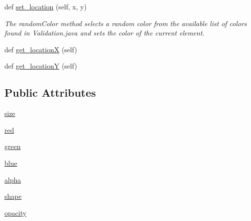 \begin{DoxyCompactItemize}
def \mbox{\hyperlink{class_bridges_1_1_element_visualizer_1_1_element_visualizer_af3ed5e44884f0a02161cd97c77a4ee9c}{set\+\_\+location}} (self, x, y)
\begin{DoxyCompactList}\small\item\em The random\+Color method selects a random color from the available list of colors found in Validation.\+java and sets the color of the current element. \end{DoxyCompactList}\item 
def \mbox{\hyperlink{class_bridges_1_1_element_visualizer_1_1_element_visualizer_a58e34c0b1398329080d2070078e4a71d}{get\+\_\+locationX}} (self)
\item 
def \mbox{\hyperlink{class_bridges_1_1_element_visualizer_1_1_element_visualizer_ac2d62ab62cd9586aa893fb4b9a4a7b65}{get\+\_\+locationY}} (self)
\end{DoxyCompactItemize}
\subsection*{Public Attributes}
\begin{DoxyCompactItemize}
\item 
\mbox{\hyperlink{class_bridges_1_1_element_visualizer_1_1_element_visualizer_addf8822075a51d2d6e718d8c36ee413d}{size}}
\item 
\mbox{\hyperlink{class_bridges_1_1_element_visualizer_1_1_element_visualizer_a44266d81c1904956ae315cefa1cee31a}{red}}
\item 
\mbox{\hyperlink{class_bridges_1_1_element_visualizer_1_1_element_visualizer_a3c23b7a96237fe6e19e498388a199ab5}{green}}
\item 
\mbox{\hyperlink{class_bridges_1_1_element_visualizer_1_1_element_visualizer_ae362091ff72d0848cc387b88ab75d1ab}{blue}}
\item 
\mbox{\hyperlink{class_bridges_1_1_element_visualizer_1_1_element_visualizer_af409ee373431b9dfb0a2266ff5128c84}{alpha}}
\item 
\mbox{\hyperlink{class_bridges_1_1_element_visualizer_1_1_element_visualizer_afb45aec7089f4af807016e558a4b0242}{shape}}
\item 
\mbox{\hyperlink{class_bridges_1_1_element_visualizer_1_1_element_visualizer_a7382c74021aa0d06c8e504083d9bf520}{opacity}}
\end{DoxyCompactItemize}
